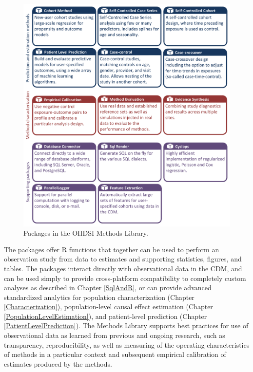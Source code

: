 \documentclass[11pt]{book}
\theoremstyle{definition}
\theoremstyle{definition}
\theoremstyle{definition}
\theoremstyle{remark}
\begin{document}
\begin{figure}

{\centering \includegraphics[width=1\linewidth]{images/OhdsiAnalyticsTools/methodsLibrary} 

}

\caption{Packages in the OHDSI Methods Library.}\label{fig:methodsLibrary}
\end{figure}

The packages offer R functions that together can be used to perform an observation study from data to estimates and supporting statistics, figures, and tables. The packages interact directly with observational data in the CDM, and can be used simply to provide cross-platform compatibility to completely custom analyses as described in Chapter \ref{SqlAndR}, or can provide advanced standardized analytics for population characterization (Chapter \ref{Characterization}), population-level causal effect estimation (Chapter \ref{PopulationLevelEstimation}), and patient-level prediction (Chapter \ref{PatientLevelPrediction}). The Methods Library supports best practices for use of observational data as learned from previous and ongoing research, such as transparency, reproducibility, as well as measuring of the operating characteristics of methods in a particular context and subsequent empirical calibration of estimates produced by the methods.
\end{document}
